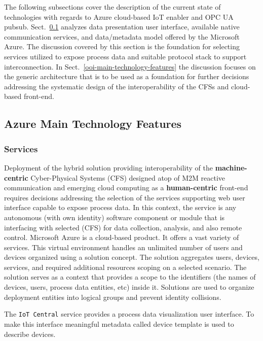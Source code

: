 \documentclass{jacsart}
\begin{document}
The following subsections cover the description of the current state of technologies with regards to Azure cloud-based IoT enabler and OPC UA pubsub. Sect.~\ref*{azure-main-technology-features} analyzes data presentation user interface, available native communication services, and data/metadata model offered by the Microsoft Azure. The discussion covered by this section is the foundation for selecting services utilized to expose process data and suitable protocol stack to support interconnection. In Sect.~\ref*{ooi-main-technology-features} the discussion focuses on the generic architecture that is to be used as a foundation for further decisions addressing the systematic design of the interoperability of the CFSs and cloud-based front-end.

\subsection{Azure Main Technology Features}\label{azure-main-technology-features}

\subsubsection{Services}\label{services}

Deployment of the hybrid solution providing interoperability of the \textbf{machine-centric} Cyber-Physical Systems (CFS) designed atop of M2M reactive communication and emerging cloud computing as a \textbf{human-centric} front-end requires decisions addressing the selection of the services supporting web user interface capable to expose process data. In this context, the service is any autonomous (with own identity) software component or module that is interfacing with selected (CFS) for data collection, analysis, and also remote control. Microsoft Azure is a cloud-based product. It offers a vast variety of services. This virtual environment handles an unlimited number of users and devices organized using a solution concept. The solution aggregates users, devices, services, and required additional resources scoping on a selected scenario. The solution serves as a context that provides a scope to the identifiers (the names of devices, users, process data entities, etc) inside it. Solutions are used to organize deployment entities into logical groups and prevent identity collisions.

The \texttt{IoT\ Central} service provides a process data visualization
user interface. To make this interface meaningful metadata called device
template is used to describe devices.
\end{document}
